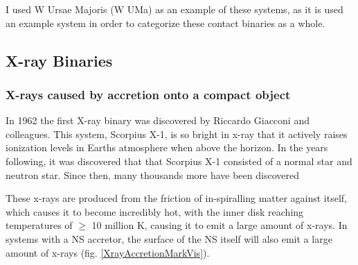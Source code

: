 \documentclass[12pt, letterpaper]{article}
\begin{document}
        
        I used W Ursae Majoris (W UMa) as an example of these systems, as it is used an example system in order to categorize these contact binaries as a whole.
    \subsection{X-ray Binaries} 
        \subsubsection{X-rays caused by accretion onto a compact object} \label{XrayAccretion}
            In 1962 the first X-ray binary was discovered by Riccardo Giacconi and colleagues. This system, Scorpius X-1, is so bright in x-ray that it actively raises ionization levels in Earths atmosphere when above the horizon. \cite{TaurisvandenHeuvel+2023} \cite{Giacconi_1962} In the years following, it was discovered that that Scorpius X-1 consisted of a normal star and neutron star. Since then, many thousands more have been discovered\cite{Haardt_1993}

            These x-rays are produced from the friction of in-spiralling matter against itself, which causes it to become incredibly hot, with the inner disk reaching temperatures of $\geq$ 10 million K, causing it to emit a large amount of x-rays. In systems with a NS accretor, the surface of the NS itself will also emit a large amount of x-rays \cite{TaurisvandenHeuvel+2023} (fig. \ref{XrayAccretionMarkVis}). 
\end{document}
